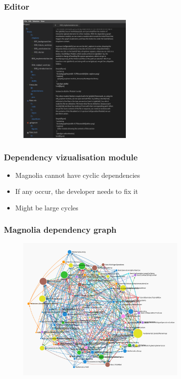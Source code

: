 \begin{frame}
  \frametitle{Editor}
  \begin{figure}
    \centering
    \includegraphics[width=0.5\textwidth]{./pics/editor.png}
  \end{figure}
\end{frame}

\begin{frame}
  \frametitle{Dependency vizualisation module}
  \begin{itemize}
    \item Magnolia cannot have cyclic dependencies
    \pause
    \item If any occur, the developer needs to fix it
    \pause
    \item Might be large cycles
  \end{itemize}
\end{frame}

\begin{frame}
  \frametitle{Magnolia dependency graph}
  \begin{figure}
    \centering
    \includegraphics[width=0.75\textwidth]{./pics/magnolia-dependencies.png}
  \end{figure}
\end{frame}

